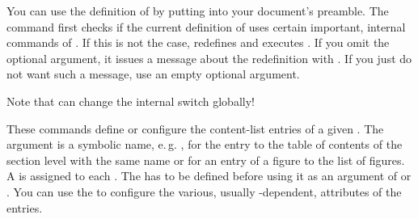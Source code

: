 You can use the definition of  by putting
 into your document's preamble. The command first
checks if the current definition of 
uses certain important, internal commands of . If this is not
the case,  redefines  and
executes . If you omit the optional argument, it issues
a message about the redefinition with . If
you just do not want such a message, use an empty optional argument.

Note that  can change the
internal switch  globally!%
\EndIndexGroup


\begin{Declaration}
\end{Declaration}
These commands define or configure the
content-list entries of a given . The 
argument is a symbolic name, e.\,g. , for the entry to the
table of contents of the section level with the same name or 
for an entry of a figure to the list of figures. A  is assigned
to each . The  has to be defined before using
it as an argument of  or
. You can use the  to
configure the various, usually -dependent, attributes of the
entries.

